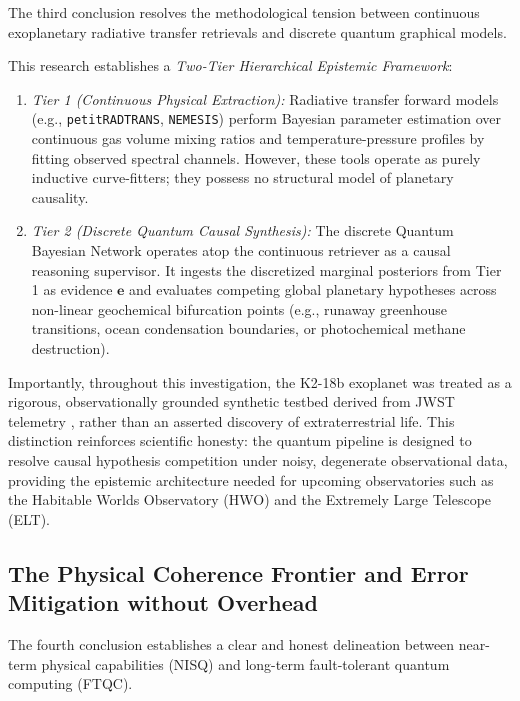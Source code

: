 The third conclusion resolves the methodological tension between continuous exoplanetary radiative transfer retrievals and discrete quantum graphical models. 

This research establishes a \emph{Two-Tier Hierarchical Epistemic Framework}:
\begin{enumerate}
    \item \emph{Tier 1 (Continuous Physical Extraction):} Radiative transfer forward models (e.g., \texttt{petitRADTRANS}, \texttt{NEMESIS}) perform Bayesian parameter estimation over continuous gas volume mixing ratios and temperature-pressure profiles by fitting observed spectral channels. However, these tools operate as purely inductive curve-fitters; they possess no structural model of planetary causality.
    \item \emph{Tier 2 (Discrete Quantum Causal Synthesis):} The discrete Quantum Bayesian Network operates atop the continuous retriever as a causal reasoning supervisor. It ingests the discretized marginal posteriors from Tier 1 as evidence $\mathbf{e}$ and evaluates competing global planetary hypotheses across non-linear geochemical bifurcation points (e.g., runaway greenhouse transitions, ocean condensation boundaries, or photochemical methane destruction).
\end{enumerate}

Importantly, throughout this investigation, the K2-18b exoplanet was treated as a rigorous, observationally grounded synthetic testbed derived from JWST telemetry \cite{madhusudhan2023}, rather than an asserted discovery of extraterrestrial life. This distinction reinforces scientific honesty: the quantum pipeline is designed to resolve causal hypothesis competition under noisy, degenerate observational data, providing the epistemic architecture needed for upcoming observatories such as the Habitable Worlds Observatory (HWO) and the Extremely Large Telescope (ELT).

\subsection{The Physical Coherence Frontier and Error Mitigation without Overhead}\label{subsec:conclusion_coherence_frontier}

The fourth conclusion establishes a clear and honest delineation between near-term physical capabilities (NISQ) and long-term fault-tolerant quantum computing (FTQC).

